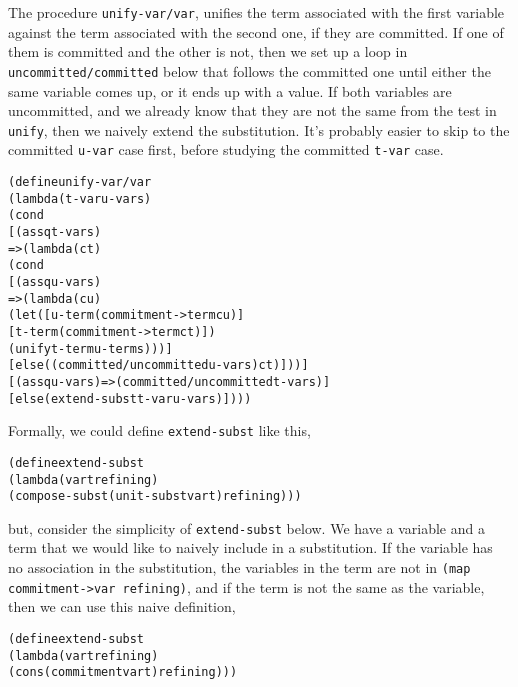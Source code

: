 The procedure \texttt{unify-var/var}, unifies the term associated with
the first variable against the term associated with the second one, if
they are committed.  If one of them is committed and the other is not,
then we set up a loop in \texttt{uncommitted/committed} below that
follows the committed one until either the same variable comes up, or
it ends up with a value.  If both variables are uncommitted, and we
already know that they are not the same from the test in
\texttt{unify}, then we naively extend the substitution.  It's
probably easier to skip to the committed \texttt{u-var} case first,
before studying the committed \texttt{t-var} case.
\begin{alltt}
(define unify-var/var
  (lambda (t-var u-var s)
    (cond
      [(assq t-var s)
       => (lambda (ct)
            (cond
              [(assq u-var s)
               => (lambda (cu)
                    (let ([u-term (commitment->term cu)]
                          [t-term (commitment->term ct)])
                      (unify t-term u-term s)))]
              [else ((committed/uncommitted u-var s) ct)]))]
      [(assq u-var s) => (committed/uncommitted t-var s)]
      [else (extend-subst t-var u-var s)])))
\end{alltt}
Formally, we could define \texttt{extend-subst} like this,
\begin{alltt}
(define extend-subst
  (lambda (var t refining)
    (compose-subst (unit-subst var t) refining)))
\end{alltt}
\noindent
but, consider the simplicity of \texttt{extend-subst} below.  We have
a variable and a term that we would like to naively include in a
substitution.  If the variable has no association in the substitution,
the variables in the term are not in \texttt{(map commitment->var
refining)}, and if the term is not the same as the variable, then we can
use this naive definition,

\begin{alltt}
(define extend-subst
  (lambda (var t refining)
    (cons (commitment var t) refining)))
\end{alltt}

